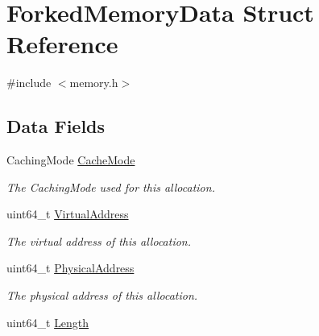 \hypertarget{structForkedMemoryData}{}\section{Forked\+Memory\+Data Struct Reference}
\label{structForkedMemoryData}


{\ttfamily \#include $<$memory.\+h$>$}

\subsection*{Data Fields}
\begin{DoxyCompactItemize}
\item 
Caching\+Mode \hyperlink{structForkedMemoryData_aea350f2a54e7b4367df75d6db2ab0484}{Cache\+Mode}\hypertarget{structForkedMemoryData_aea350f2a54e7b4367df75d6db2ab0484}{}\label{structForkedMemoryData_aea350f2a54e7b4367df75d6db2ab0484}

\begin{DoxyCompactList}\small\item\em The Caching\+Mode used for this allocation. \end{DoxyCompactList}\item 
uint64\+\_\+t \hyperlink{structForkedMemoryData_af755e2ad12dce20145cfcbd07ff2c4c3}{Virtual\+Address}\hypertarget{structForkedMemoryData_af755e2ad12dce20145cfcbd07ff2c4c3}{}\label{structForkedMemoryData_af755e2ad12dce20145cfcbd07ff2c4c3}

\begin{DoxyCompactList}\small\item\em The virtual address of this allocation. \end{DoxyCompactList}\item 
uint64\+\_\+t \hyperlink{structForkedMemoryData_aecc1db7b412f9b7f875eca5f73910698}{Physical\+Address}\hypertarget{structForkedMemoryData_aecc1db7b412f9b7f875eca5f73910698}{}\label{structForkedMemoryData_aecc1db7b412f9b7f875eca5f73910698}

\begin{DoxyCompactList}\small\item\em The physical address of this allocation. \end{DoxyCompactList}\item 
uint64\+\_\+t \hyperlink{structForkedMemoryData_a823cec539fdf5f87899149b6ebc5a46a}{Length}\hypertarget{structForkedMemoryData_a823cec539fdf5f87899149b6ebc5a46a}{}\label{structForkedMemoryData_a823cec539fdf5f87899149b6ebc5a46a}


\end{DoxyCompactItemize}
